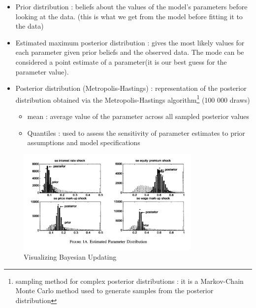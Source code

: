 \documentclass{article}
\begin{document}
\begin{detailbox2}
\begin{itemize}
    \item Prior distribution : beliefs about the values of the model's parameters before looking at the data. (this is what we get from the model before fitting it to the data)
    \begin{itemize}
    \end{itemize}
    \item Estimated maximum posterior distribution : gives the most likely values for each parameter given prior beliefs and the observed data. The mode can be considered a point estimate of a parameter(it is our best guess for the parameter value).
    \item Posterior distribution (Metropolis-Hastings) : representation of the posterior distribution obtained via the Metropolis-Hastings algorithm\footnote{sampling method for complex posterior distributions :  it is a Markov-Chain Monte Carlo method used to generate samples from the posterior distribution} (100 000 draws)
    \begin{itemize}
        \item mean : average value of the parameter across all sampled posterior values
        \item Quantiles : used to assess the sensitivity of  parameter estimates to prior assumptions and model specifications
    \end{itemize}
\end{itemize}

\begin{figure}[H]  
    \centering  
    \includegraphics[width=0.8\textwidth]{Pictures/Screenshot 2025-03-26 at 8.17.40 PM.png}  
    \caption{Visualizing Bayesian Updating}  
    \label{fig:myimage}  
\end{figure}
\end{detailbox2}
\end{document}
